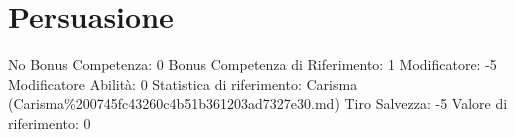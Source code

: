 \section{Persuasione}\label{persuasione}

\begin{description}
\tightlist
\item[Tags: ABI]
No Bonus Competenza: 0 Bonus Competenza di Riferimento: 1 Modificatore:
-5 Modificatore Abilità: 0 Statistica di riferimento: Carisma
(Carisma\%200745fc43260c4b51b361203ad7327e30.md) Tiro Salvezza: -5
Valore di riferimento: 0
\end{description}
